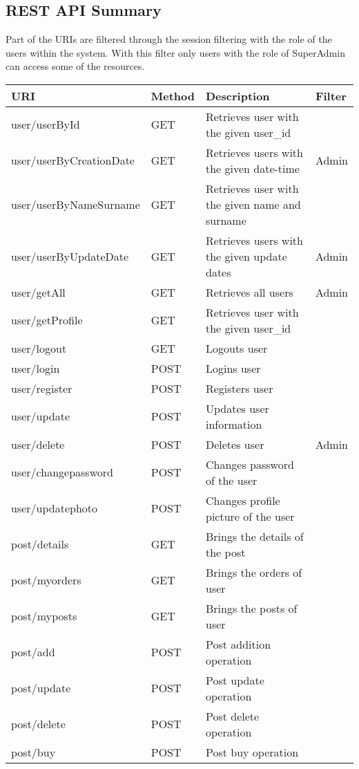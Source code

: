 \subsection{REST API Summary}


Part of the URIs are filtered through the session filtering with the role of the users within the system. With this filter only users with the role of SuperAdmin can access some of the resources.

\begin{longtable}{|p{}|p{} |p{}|p{}|} 
\hline
\textbf{URI} & \textbf{Method} & \textbf{Description} & \textbf{Filter} \\\hline

user/userById & GET & Retrieves user with the given user\_id & \\\hline
user/userByCreationDate & GET & Retrieves users with the given date-time & Admin\\\hline
user/userByNameSurname & GET & Retrieves user with the given name and surname & \\\hline
user/userByUpdateDate & GET & Retrieves users with the given update dates & Admin\\\hline
user/getAll & GET & Retrieves all users & Admin\\\hline
user/getProfile & GET & Retrieves user with the given user\_id & \\\hline
user/logout & GET & Logouts user & \\\hline
user/login & POST & Logins user & \\\hline
user/register & POST & Registers user &\\\hline
user/update & POST & Updates user information & \\\hline
user/delete & POST & Deletes user & Admin\\\hline
user/changepassword & POST & Changes password of the user & \\\hline
user/updatephoto & POST & Changes profile picture of the user &\\\hline

post/details & GET & Brings the details of the post & \\\hline
post/myorders & GET & Brings the orders of user &\\\hline
post/myposts & GET & Brings the posts of user & \\\hline
post/add & POST & Post addition operation &\\\hline
post/update & POST & Post update operation & \\\hline
post/delete & POST & Post delete operation &\\\hline
post/buy & POST & Post buy operation & \\\hline



\end{longtable}
